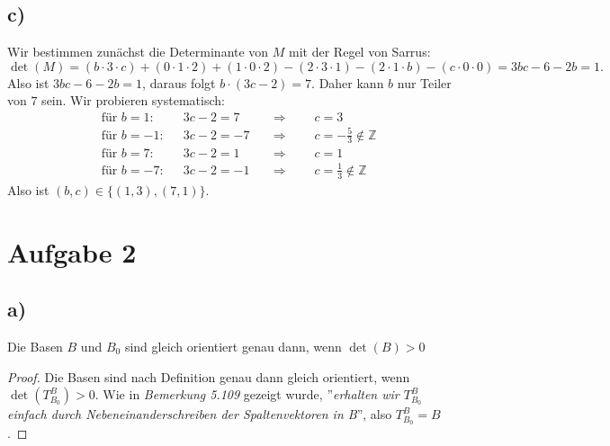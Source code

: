 \documentclass{article}
\newcommand{\ZZ}{\mathbb{Z}}
\newcommand{\imp}{\mathbb{\Rightarrow}}
\begin{document}
\subsection*{c)}
Wir bestimmen zunächst die Determinante von $M$
mit der Regel von Sarrus:
\[
  \det(M) = (b \cdot 3 \cdot c) + (0 \cdot 1 \cdot 2)
  + (1 \cdot 0 \cdot 2) - (2 \cdot 3 \cdot 1) - (2 \cdot 1
  \cdot b) - (c \cdot 0 \cdot 0)
  = 3bc - 6 - 2b = 1.
\]
Also ist
$
  3bc - 6 - 2b = 1$,
  daraus folgt
  $b \cdot (3c-2) = 7.
$
Daher kann $b$ nur Teiler von $7$ sein.
Wir probieren systematisch:
\begin{align*}
  &\text{für $b = 1$:}   && 3c-2 = 7 &&\imp\qquad c = 3 \\
  &\text{für $b = -1$:}   && 3c-2 = -7 &&\imp\qquad c = -\frac{5}{3} \notin \ZZ \\
  &\text{für $b = 7$:}   && 3c-2 = 1 &&\imp\qquad c = 1 \\
  &\text{für $b = -7$:}   && 3c-2 = -1 &&\imp\qquad c = \frac{1}{3} \notin \ZZ
\end{align*}
Also ist $(b,c) \in \{(1,3),(7,1)\}$.



\newpage

\section*{Aufgabe 2}

\subsection*{a)}

Die Basen $B$ und $B_0$ sind gleich orientiert genau
dann, wenn $\det(B) > 0$

\begin{proof}
Die Basen sind nach Definition genau dann gleich orientiert,
wenn $\det(T^B_{B_0}) > 0$. Wie in \textit{Bemerkung 5.109}
gezeigt wurde, ''\textit{erhalten wir $T^B_{B_0}$
einfach durch Nebeneinanderschreiben der Spaltenvektoren in B}'',
also $T^B_{B_0} = B$.
\end{proof}
\end{document}
